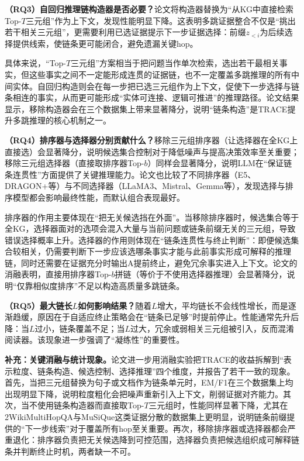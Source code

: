 \textbf{（RQ3）自回归推理链构造器是否必要？}论文将构造器替换为“从KG中直接检索Top-$T$三元组”作为上下文，发现性能明显下降。这表明多跳证据整合不仅是“挑出若干相关三元组”，更需要利用已选证据提示下一步证据选择：前缀$z_{<i}$为后续选择提供线索，使链条更可能闭合，避免遗漏关键hop。

具体来说，“Top-$T$三元组”方案相当于把问题当作单次检索，选出若干最相关事实，但这些事实之间不一定能形成连贯的证据链，也不一定覆盖多跳推理的所有中间实体。自回归构造则会在每一步把已选三元组作为上下文，促使下一步选择与链条相连的事实，从而更可能形成“实体可连接、逻辑可推进”的推理路径。论文结果显示，移除构造器会在三个数据集上带来显著降分，说明“链条构造”是TRACE提升多跳推理的核心机制之一。

\textbf{（RQ4）排序器与选择器分别贡献什么？}移除三元组排序器（让选择器在全KG上直接选）会显著降分，说明候选集合控制对于降低噪声与提高决策效率至关重要；移除三元组选择器（直接取排序器Top-$b$）同样会显著降分，说明LLM在“保证链条连贯性”方面提供了关键推理能力。论文也比较了不同排序器（E5、DRAGON+等）与不同选择器（LLaMA3、Mistral、Gemma等），发现选择与排序模型都会影响最终性能，而默认组合表现最好。

排序器的作用主要体现在“把无关候选挡在外面”。当移除排序器时，候选集合等于全KG，选择器面对的选项会混入大量与当前问题或链条前缀无关的三元组，导致错误选择概率上升。选择器的作用则体现在“链条连贯性与终止判断”：即便候选集合较相关，仍需要判断下一步应该选哪条事实才能与此前事实形成可解释的推理链，同时还需要在证据充分时输出A提前终止，避免冗余事实进入上下文。论文的消融表明，直接用排序器Top-$b$拼链（等价于不使用选择器推理）会显著降分，说明“仅靠相似度排序”不足以构造高质量多跳链条。

\textbf{（RQ5）最大链长$L$如何影响结果？}随着$L$增大，平均链长不会线性增长，而是逐渐趋缓，原因在于自适应终止策略会在“链条已足够”时提前停止。性能通常先升后降：当$L$过小，链条覆盖不足；当$L$过大，冗余或弱相关三元组被引入，反而混淆阅读器。该现象进一步强调了“凝练性”的重要性。

\textbf{补充：关键消融与统计现象。}论文进一步用消融实验把TRACE的收益拆解到“表示粒度、链条构造、候选控制、选择推理”四个维度，并报告了若干一致的现象。首先，当把三元组替换为句子或文档作为链条单元时，EM/F1在三个数据集上均出现明显下降，说明粒度粗化会把噪声重新引入上下文，削弱证据对齐能力。其次，当不使用链条构造器而直接取Top-$T$三元组时，性能同样显著下降，尤其在2WikiMultiHopQA与MuSiQue这类证据分散的数据集上更明显，说明链条前缀提供的“下一步线索”对于覆盖所有hop至关重要。再次，移除排序器或选择器都会严重退化：排序器负责把无关候选降到可控范围，选择器负责把候选组织成可解释链条并判断终止时机，两者缺一不可。

